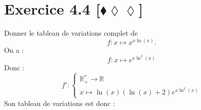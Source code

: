 \documentclass[10pt]{article}
\begin{document}
\section*{Exercice 4.4 [$\blacklozenge\lozenge\lozenge$]}
\begin{tcolorbox}[enhanced, width=7in, center, size=fbox, fontupper=\large, drop shadow southwest]
    Donner le tableau de variations complet de
    \begin{equation*}
        f:x\mapsto x^{x\ln(x)}.
    \end{equation*}
    On a :
    \begin{equation*}
        f:x\mapsto e^{x\ln^2(x)}
    \end{equation*}
    Donc :
    \begin{equation*}
        f':\begin{cases}\mathbb{R}_+^*\rightarrow\mathbb{R}\\x\mapsto\ln(x)(\ln(x)+2)e^{x\ln^2(x)}\end{cases}
    \end{equation*}
    Son tableau de variations est donc :
    \begin{center}
    \end{center}
\end{tcolorbox}
\end{document}
